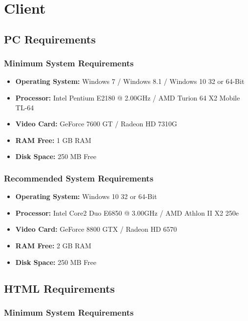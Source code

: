 \section{Client}

\subsection{PC Requirements}

\subsubsection{Minimum System Requirements}

\begin {itemize}	
	\item \textbf{Operating System:} Windows 7 / Windows 8.1 / Windows 10 32 or 64-Bit
	\item \textbf{Processor:} Intel Pentium E2180 @ 2.00GHz / AMD Turion 64 X2 Mobile TL-64
	\item \textbf{Video Card:}  GeForce 7600 GT / Radeon HD 7310G
	\item \textbf{RAM Free:}  1 GB RAM
	\item \textbf{Disk Space:} 250 MB Free

\end {itemize}

\subsubsection{Recommended System Requirements}

\begin {itemize}	
	\item \textbf{Operating System:} Windows 10 32 or 64-Bit
	\item \textbf{Processor:} Intel Core2 Duo E6850 @ 3.00GHz / AMD Athlon II X2 250e
	\item \textbf{Video Card:}  GeForce 8800 GTX / Radeon HD 6570
	\item \textbf{RAM Free:}  2 GB RAM
	\item \textbf{Disk Space:} 250 MB Free
\end {itemize}

\subsection{HTML Requirements}

\subsubsection{Minimum System Requirements}

